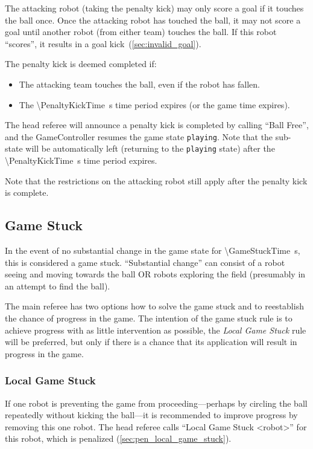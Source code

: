 The attacking robot (taking the penalty kick) may only score a goal if it touches the ball once.
Once the attacking robot has touched the ball, it may not score a goal until another robot (from either team) touches the ball.
If this robot ``scores'', it results in a goal kick~(\cf \cref{sec:invalid_goal}).

The penalty kick is deemed completed if:
\begin{itemize}
  \item The attacking team touches the ball, even if the robot has fallen.
  \item The \qty{\PenaltyKickTime}{\second} time period expires (or the game time expires).
\end{itemize}

The head referee will announce a penalty kick is completed by calling ``Ball Free'', and the GameController resumes the game state \texttt{playing}.
Note that the sub-state will be automatically left (returning to the \texttt{playing} state) after the \qty{\PenaltyKickTime}{\second} time period expires.

Note that the restrictions on the attacking robot still apply after the penalty kick is complete.

\subsection{Game Stuck}
\label{sec:game_stuck}

In the event of no substantial change in the game state for \qty{\GameStuckTime}{\second}, this is considered a game stuck.
``Substantial change'' can consist of a robot seeing and moving towards the ball OR robots exploring the field (presumably in an attempt to find the ball).

The main referee has two options how to solve the game stuck and to reestablish the chance of progress in the game.
The intention of the game stuck rule is to achieve progress with as little intervention as possible, \ie the \emph{Local Game Stuck} rule will be preferred, but only if there is a chance that its application will result in progress in the game.

\subsubsection{Local Game Stuck}
\label{sec:game_stuck:local}

If one robot is preventing the game from proceeding---perhaps by circling the ball repeatedly without kicking the ball---it is recommended to improve progress by removing this one robot.
The head referee calls ``Local Game Stuck \textless robot\textgreater'' for this robot, which is penalized (\cf \cref{sec:pen_local_game_stuck}).

